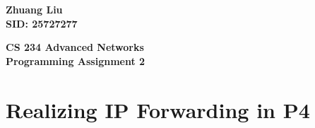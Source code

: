 \documentclass{article}%
\begin{document}
\begin{flushright}
\begin{Large}

\textbf{Zhuang Liu \\
SID: 25727277}
\end{Large}
\end{flushright}

\begin{center}
\begin{huge}
\textbf{CS 234 Advanced Networks \\
Programming Assignment 2} \\
\end{huge}
\end{center}
\section{Realizing IP Forwarding in P4}
\end{document}
